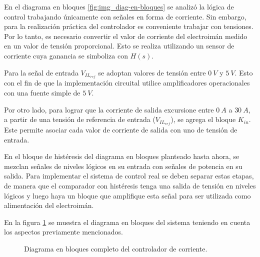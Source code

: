 En el diagrama en bloques \ref{fig:img_diag-en-bloques} se analizó la lógica de control trabajando únicamente con señales en forma de corriente. Sin embargo, para la realización práctica del controlador es conveniente trabajar con tensiones. Por lo tanto, es necesario  convertir el valor de corriente del electroimán medido en un valor de tensión proporcional. Esto se realiza utilizando un sensor de corriente cuya ganancia se simboliza con $H(s)$.

Para la señal de entrada $V_{IL_{ref}}$ se adoptan valores de tensión entre $0\:V$ y $5\:V$. Esto con el fin de que la implementación circuital utilice amplificadores operacionales con una fuente simple de $5\:V$. 

Por otro lado, para lograr que la corriente de salida excursione entre $0\:A$ a $30\:A$, a partir de una tensión de referencia de entrada ($V_{IL_{ref}}$), se agrega el bloque $K_{in}$. Este permite asociar cada valor de corriente de salida con uno de tensión de entrada.

En el bloque de histéresis del diagrama en bloques planteado hasta ahora, se mezclan señales de niveles lógicos en su entrada con señales de potencia en su salida. Para implementar el sistema de control real se deben separar estas etapas, de manera que el comparador con histéresis tenga una salida de tensión en niveles lógicos y luego haya un bloque que amplifique esta señal para ser utilizada como alimentación del electroimán.

En la figura \ref{fig:img_diag-en-bloques-conH-y-Kin} se muestra el diagrama en bloques del sistema teniendo en cuenta los aspectos previamente mencionados.


\begin{figure}[H]
	\centering
	
	\caption{Diagrama en bloques completo del controlador de corriente.}	\label{fig:img_diag-en-bloques-conH-y-Kin}
\end{figure}


